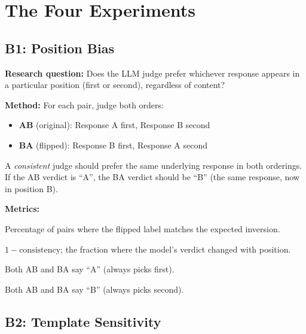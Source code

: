 \documentclass[11pt,a4paper]{article}
\begin{document}
\section{The Four Experiments}\label{sec:experiments}

\subsection{B1: Position Bias}\label{sec:b1}

\begin{experimentbox}
\textbf{Research question:} Does the LLM judge prefer whichever response
appears in a particular position (first or second), regardless of content?

\medskip
\textbf{Method:} For each pair, judge both orders:
\begin{itemize}[nosep]
  \item \textbf{AB} (original): Response A first, Response B second
  \item \textbf{BA} (flipped): Response B first, Response A second
\end{itemize}
A \emph{consistent} judge should prefer the same underlying response in both
orderings. If the AB verdict is ``A'', the BA verdict should be ``B''
(the same response, now in position B).

\medskip
\textbf{Metrics:}
\begin{description}[nosep, leftmargin=1.2cm]
  \item[\texttt{position\_consistency}] Percentage of pairs where the flipped
    label matches the expected inversion.
  \item[\texttt{position\_bias\_rate}] $1 - \text{consistency}$; the fraction
    where the model's verdict changed with position.
  \item[\texttt{bias\_toward\_first\_position}] Both AB and BA say ``A''
    (always picks first).
  \item[\texttt{bias\_toward\_second\_position}] Both AB and BA say ``B''
    (always picks second).
\end{description}
\end{experimentbox}


\subsection{B2: Template Sensitivity}\label{sec:b2}
\end{document}
